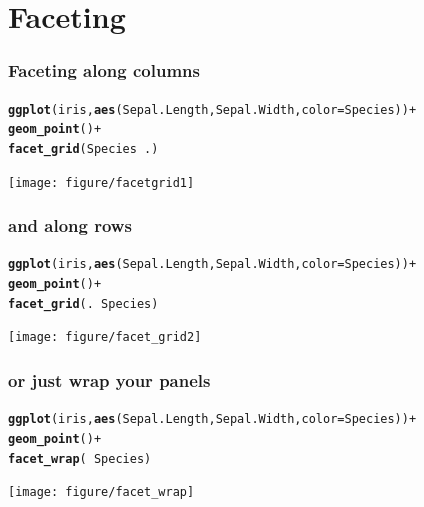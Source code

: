\documentclass{beamer}\usepackage{graphicx, color}
\makeatletter
\newcommand{\hlfunctioncall}[1]{\textcolor[rgb]{0.501960784313725,0,0.329411764705882}{\textbf{#1}}}%
\newenvironment{kframe}{%
 \def\at@end@of@kframe{}%
 \ifinner\ifhmode%
  \def\at@end@of@kframe{\end{minipage}}%
  \begin{minipage}{\columnwidth}%
 \fi\fi%
 \def\FrameCommand##1{\hskip\@totalleftmargin \hskip-\fboxsep
 \colorbox{shadecolor}{##1}\hskip-\fboxsep
     \hskip-\linewidth \hskip-\@totalleftmargin \hskip\columnwidth}%
 \MakeFramed {\advance\hsize-\width
   \@totalleftmargin\z@ \linewidth\hsize
   \@setminipage}}%
 {\par\unskip\endMakeFramed%
 \at@end@of@kframe}
\newenvironment{knitrout}{}{} %
\makeatother
\begin{document}

\section*{Faceting}
\frame{\sectionpage}

\begin{frame}[fragile]
\frametitle{Faceting along columns}
\begin{knitrout}\footnotesize
{}\color{fgcolor}\begin{kframe}
\begin{alltt}
\hlfunctioncall{ggplot}(iris, \hlfunctioncall{aes}(Sepal.Length, Sepal.Width, color = Species)) +
\hlfunctioncall{geom_point}() +
\hlfunctioncall{facet_grid}(Species ~ .)
\end{alltt}
\end{kframe}
\texttt{[image: figure/facetgrid1]} 

\end{knitrout}

\end{frame}

\begin{frame}[fragile]
\frametitle{and along rows}
\begin{knitrout}\footnotesize
{}\color{fgcolor}\begin{kframe}
\begin{alltt}
\hlfunctioncall{ggplot}(iris, \hlfunctioncall{aes}(Sepal.Length, Sepal.Width, color = Species)) +
\hlfunctioncall{geom_point}() +
\hlfunctioncall{facet_grid}(. ~ Species)
\end{alltt}
\end{kframe}
\texttt{[image: figure/facet\_grid2]} 

\end{knitrout}

\end{frame}

\begin{frame}[fragile]
\frametitle{or just wrap your panels}
\begin{knitrout}\footnotesize
{}\color{fgcolor}\begin{kframe}
\begin{alltt}
\hlfunctioncall{ggplot}(iris, \hlfunctioncall{aes}(Sepal.Length, Sepal.Width, color = Species)) +
\hlfunctioncall{geom_point}() +
\hlfunctioncall{facet_wrap}( ~ Species)
\end{alltt}
\end{kframe}
\texttt{[image: figure/facet\_wrap]} 

\end{knitrout}

\end{frame}
\end{document}
